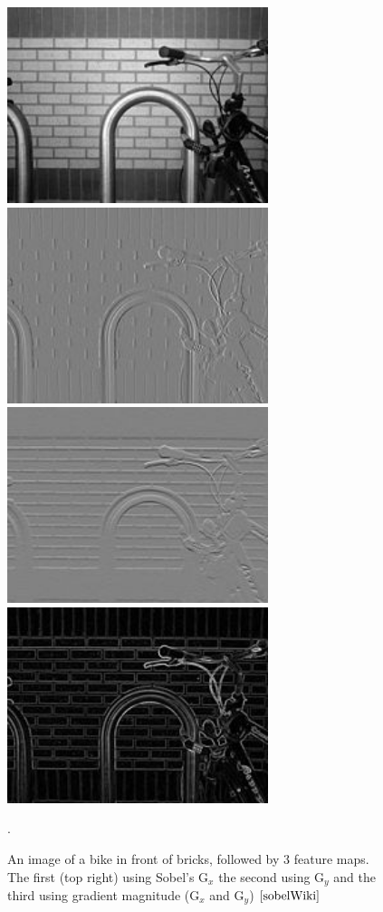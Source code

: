 \documentclass[12pt]{report} %
\begin{document}
\begin{figure}
\centering
\includegraphics[width=3in]{sobel_bike} 
\includegraphics[width=3in]{sobel_x} 
\includegraphics[width=3in]{sobel_y} 
\includegraphics[width=3in]{sobel_gradient} 
\caption{An image of a bike in front of bricks, followed by 3 feature maps. The first (top right) using Sobel's G$_{x}$ the second using G$_{y}$ and the third using gradient magnitude (G$_{x}$ and G$_{y}$) $\cite{sobelWiki}$}.
\end{figure}	
	
\end{document}
